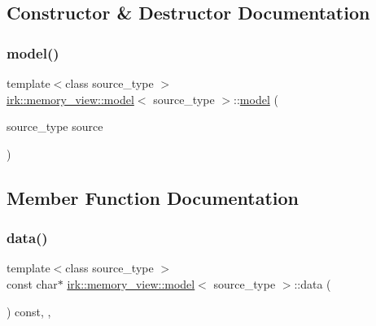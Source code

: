 \subsection{Constructor \& Destructor Documentation}
\mbox{\label{classirk_1_1memory__view_1_1model_a47843c84f96ecb25ce8c81ce47c214b4}} 
\subsubsection{\texorpdfstring{model()}{model()}}
{\footnotesize\ttfamily template$<$class source\+\_\+type $>$ \\
\mbox{\hyperlink{classirk_1_1memory__view_1_1model}{irk\+::memory\+\_\+view\+::model}}$<$ source\+\_\+type $>$\+::\mbox{\hyperlink{classirk_1_1memory__view_1_1model}{model}} (\begin{DoxyParamCaption}\item[{source\+\_\+type}]{source }\end{DoxyParamCaption})\hspace{0.3cm}{\ttfamily [inline]}}



\subsection{Member Function Documentation}
\mbox{\label{classirk_1_1memory__view_1_1model_a5a7c432c460f99bd8b78c29ef6d44009}} 
\subsubsection{\texorpdfstring{data()}{data()}}
{\footnotesize\ttfamily template$<$class source\+\_\+type $>$ \\
const char$\ast$ \mbox{\hyperlink{classirk_1_1memory__view_1_1model}{irk\+::memory\+\_\+view\+::model}}$<$ source\+\_\+type $>$\+::data (\begin{DoxyParamCaption}{ }\end{DoxyParamCaption}) const\hspace{0.3cm}{\ttfamily [inline]}, {\ttfamily [override]}, {\ttfamily [virtual]}}




